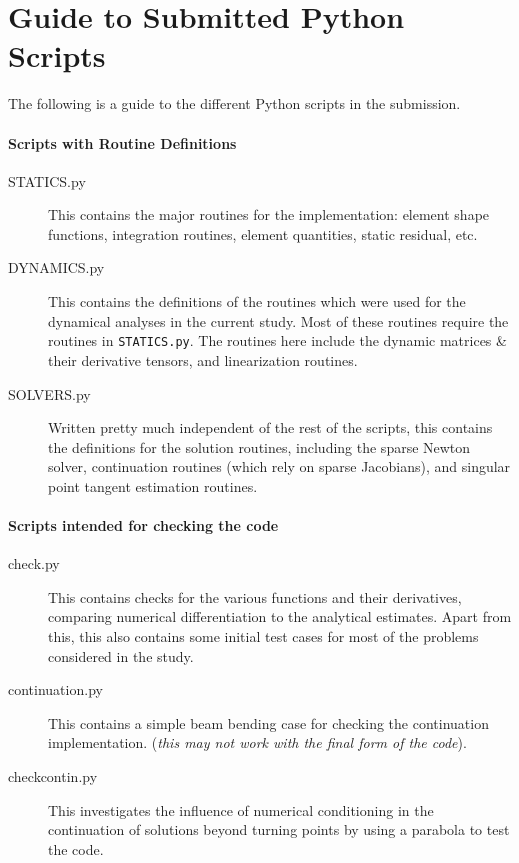 \documentclass[10pt]{article}
\begin{document}
\pagebreak
\appendix{}
\section{Guide to Submitted Python Scripts}
\label{sec:guide-subm-pyth}

The following is a guide to the different Python scripts in the
submission.

\paragraph{Scripts with Routine Definitions}
\begin{description}
\item[STATICS.py] This contains the major routines for the
  implementation: element shape functions, integration routines,
  element quantities, static residual, etc.
\item[DYNAMICS.py] This contains the definitions of the routines which
  were used for the dynamical analyses in the current study. Most of
  these routines require the routines in \texttt{STATICS.py}. The
  routines here include the dynamic matrices \& their derivative
  tensors, and linearization routines.
\item[SOLVERS.py] Written pretty much independent of the rest of the
  scripts, this contains the definitions for the solution routines,
  including the sparse Newton solver, continuation routines (which
  rely on sparse Jacobians), and singular point tangent estimation
  routines.
\end{description}

\paragraph{Scripts intended for checking the code}
\begin{description}
\item[check.py] This contains checks for the various functions and
  their derivatives, comparing numerical differentiation to the
  analytical estimates. Apart from this, this also contains some
  initial test cases for most of the problems considered in the
  study.
\item[continuation.py] This contains a simple beam bending case for
  checking the continuation implementation. (\emph{this may not work
    with the final form of the code}).
\item[checkcontin.py] This investigates the influence of numerical
  conditioning in the continuation of solutions beyond turning
  points by using a parabola to test the code.
\end{description}
\end{document}
